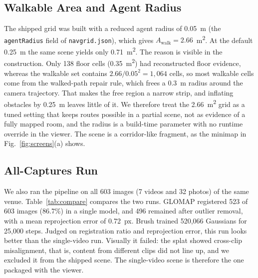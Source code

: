 \documentclass[conference]{IEEEtran}
\begin{document}
\subsection{Walkable Area and Agent Radius}
The shipped grid was built with a reduced agent radius of 0.05~m (the \texttt{agentRadius} field of \texttt{navgrid.json}), which gives $A_{\mathrm{walk}} = 2.66$~m\textsuperscript{2}. At the default 0.25~m the same scene yields only 0.71~m\textsuperscript{2}. The reason is visible in the construction. Only 138 floor cells (0.35~m\textsuperscript{2}) had reconstructed floor evidence, whereas the walkable set contains $2.66/0.05^{2} = 1{,}064$ cells, so most walkable cells come from the walked-path repair rule, which frees a 0.3~m radius around the camera trajectory. That makes the free region a narrow strip, and inflating obstacles by 0.25~m leaves little of it. We therefore treat the 2.66~m\textsuperscript{2} grid as a tuned setting that keeps routes possible in a partial scene, not as evidence of a fully mapped room, and the radius is a build-time parameter with no runtime override in the viewer. The scene is a corridor-like fragment, as the minimap in Fig.~\ref{fig:screens}(a) shows.

\subsection{All-Captures Run}
We also ran the pipeline on all 603 images (7 videos and 32 photos) of the same venue. Table~\ref{tab:compare} compares the two runs. GLOMAP registered 523 of 603 images (86.7\%) in a single model, and 496 remained after outlier removal, with a mean reprojection error of 0.72~px. Brush trained 520,066 Gaussians for 25,000 steps. Judged on registration ratio and reprojection error, this run looks better than the single-video run. Visually it failed: the splat showed cross-clip misalignment, that is, content from different clips did not line up, and we excluded it from the shipped scene. The single-video scene is therefore the one packaged with the viewer.
\end{document}
